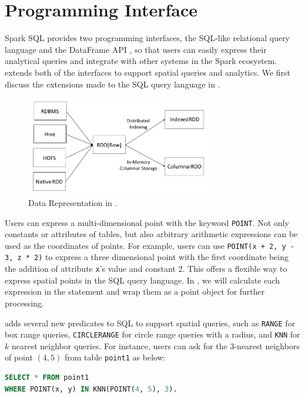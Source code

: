 \vspace{-2mm}
\section{Programming Interface}
\label{sec:parser}
Spark SQL provides two programming interfaces, the SQL-like relational
query language and the DataFrame API \cite{sparksql}, so that users
can easily express their analytical queries and integrate with other
systems in the Spark ecosystem. \name extends both of the interfaces
to support spatial queries and analytics. We first discuss the
extensions made to the SQL query language in \name.


\begin{figure}[t!]
	\centering
	\includegraphics[width = 3.2in]{figs/storage}
	\vspace{-3mm}
	\caption{Data Representation in \name.}
	\label{fig:storage}
	\vspace{-3mm}
\end{figure}



 Users can express a multi-dimensional point with
the keyword \texttt{POINT}. Not only constants or attributes of
tables, but also arbitrary arithmetic expressions can be used as the
coordinates of points. For example, users can use \texttt{POINT(x + 2,
  y - 3, z * 2)} to express a three dimensional point with the first
coordinate being the addition of attribute \texttt{x}'s value and
constant 2. This offers a flexible way to express spatial points in
the SQL query language. In \name, we will calculate each expression
in the statement and wrap them as a point object for further processing.

 \name adds several new predicates to
SQL to support spatial queries, such as \texttt{RANGE} for box range
queries, \texttt{CIRCLERANGE} for circle range queries with a radius,
and \texttt{KNN} for $k$ nearest neighbor queries. For instance, users
can ask for the 3-nearest neighbors of point $(4, 5)$ from table
\texttt{point1} as below:
\begin{lstlisting}[language=SQL]
SELECT * FROM point1
WHERE POINT(x, y) IN KNN(POINT(4, 5), 3).
\end{lstlisting}\vspace{-2mm}

